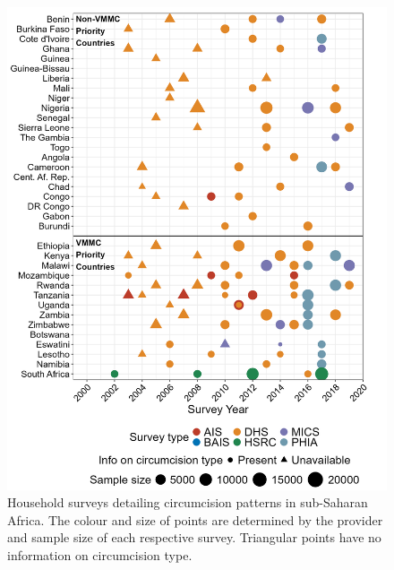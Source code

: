 \documentclass{article}
\begin{document}
\begin{appendix}
\begin{figure}[!hbtp]
    \centering
    \includegraphics[width=0.8\linewidth]{paper/plots/01_survey_table.png}
    \caption{Household surveys detailing circumcision patterns in sub-Saharan Africa. The colour and size of points are determined by the provider and sample size of each respective survey. Triangular points have no information on circumcision type.}
    \label{fig:enter-label}
\end{figure}

\begin{landscape}

\end{landscape}


\end{appendix}
\end{document}
